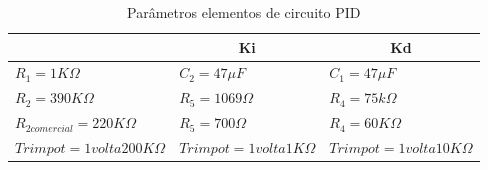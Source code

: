 
\begin{table}[H]
\centering
\caption{Parâmetros elementos de circuito PID}
\label{Paramentros PID}
\begin{tabular}{|l|l|l|}
\hline
\rowcolor[HTML]{FCFF2F} 
\multicolumn{1}{|c|}{\cellcolor[HTML]{FCFF2F}\textbf{Kp}} & \multicolumn{1}{c|}{\cellcolor[HTML]{FCFF2F}\textbf{Ki}} & \multicolumn{1}{c|}{\cellcolor[HTML]{FCFF2F}\textbf{Kd}} \\ \hline
$R_{1}= 1 K\Omega$                                       & $C_{2}= 47 \mu F$                                       & $C_{1}= 47\mu F$                                        \\ \hline
$R_{2}= 390 K\Omega$                                     & $R_{5}= 1069 \Omega$                                    & $R_{4}= 75 k\Omega$                                     \\ \hline
$R_{2 comercial} = 220 K\Omega$                          & $R_{5}= 700 \Omega$                                     & $R_{4}=60 K\Omega$                                      \\ \hline
$Trimpot = 1 volta 200 K\Omega$                             & $Trimpot = 1 volta 1 K\Omega$                              &$ Trimpot = 1 volta 10 K\Omega$                             \\ \hline
\end{tabular}
\end{table}

